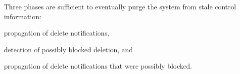 \begin{theorem}
  Three phases are sufficient to eventually purge the system from
  stale control information:
  \begin{inparaenum}[(i)]
  \item propagation of delete notifications,
  \item detection of possibly blocked deletion, and
  \item propagation of delete notifications that were possibly blocked.
  \end{inparaenum}
\end{theorem}


